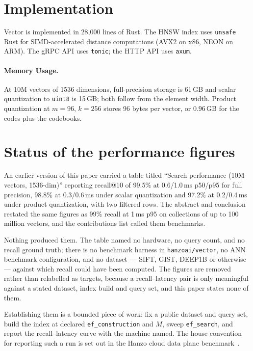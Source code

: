 \documentclass[11pt,twocolumn]{article}
\begin{document}
\section{Implementation}

Vector is implemented in 28,000 lines of Rust. The HNSW index uses \texttt{unsafe} Rust for SIMD-accelerated distance computations (AVX2 on x86, NEON on ARM). The gRPC API uses \texttt{tonic}; the HTTP API uses \texttt{axum}.

\paragraph{Memory Usage.} At 10M vectors of 1536 dimensions, full-precision storage is 61\,GB and scalar quantization to \texttt{uint8} is 15\,GB; both follow from the element width. Product quantization at $m=96$, $k=256$ stores 96 bytes per vector, or 0.96\,GB for the codes plus the codebooks.

\section{Status of the performance figures}
\label{sec:figures}

An earlier version of this paper carried a table titled ``Search performance
(10M vectors, 1536-dim)'' reporting recall@10 of 99.5\% at 0.6/1.0\,ms p50/p95
for full precision, 98.8\% at 0.3/0.6\,ms under scalar quantization and 97.2\%
at 0.2/0.4\,ms under product quantization, with two filtered rows. The abstract
and conclusion restated the same figures as 99\% recall at 1\,ms p95 on
collections of up to 100 million vectors, and the contributions list called them
benchmarks.

Nothing produced them. The table named no hardware, no query count, and no
recall ground truth; there is no benchmark harness in \texttt{hanzoai/vector},
no ANN benchmark configuration, and no dataset --- SIFT, GIST, DEEP1B or
otherwise --- against which recall could have been computed. The figures are
removed rather than relabelled as targets, because a recall--latency pair is
only meaningful against a stated dataset, index build and query set, and this
paper states none of them.

Establishing them is a bounded piece of work: fix a public dataset and query
set, build the index at declared \texttt{ef\_construction} and $M$, sweep
\texttt{ef\_search}, and report the recall--latency curve with the machine
named. The house convention for reporting such a run is set out in the Hanzo
cloud data plane benchmark~\cite{clouddataplane}.
\end{document}
